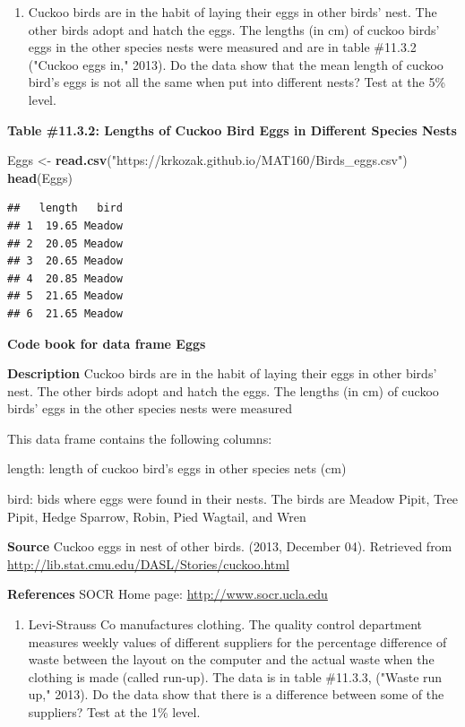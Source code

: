 \documentclass[]{book}
\newenvironment{Shaded}{\begin{snugshade}}{\end{snugshade}}
\newcommand{\KeywordTok}[1]{\textcolor[rgb]{0.13,0.29,0.53}{\textbf{#1}}}
\newcommand{\NormalTok}[1]{#1}
\newcommand{\StringTok}[1]{\textcolor[rgb]{0.31,0.60,0.02}{#1}}
\providecommand{\tightlist}{%
  \setlength{\itemsep}{0pt}\setlength{\parskip}{0pt}}
\begin{document}
\begin{enumerate}
\def\labelenumi{\arabic{enumi}.}
\tightlist
\item
  Cuckoo birds are in the habit of laying their eggs in other birds' nest. The other birds adopt and hatch the eggs. The lengths (in cm) of cuckoo birds' eggs in the other species nests were measured and are in table \#11.3.2 ("Cuckoo eggs in," 2013). Do the data show that the mean length of cuckoo bird's eggs is not all the same when put into different nests? Test at the 5\% level.
\end{enumerate}

\textbf{Table \#11.3.2: Lengths of Cuckoo Bird Eggs in Different Species Nests}

\begin{Shaded}
\begin{Highlighting}[]
\NormalTok{Eggs <-}\StringTok{ }\KeywordTok{read.csv}\NormalTok{(}\StringTok{"https://krkozak.github.io/MAT160/Birds_eggs.csv"}\NormalTok{)}
\KeywordTok{head}\NormalTok{(Eggs)}
\end{Highlighting}
\end{Shaded}

\begin{verbatim}
##   length   bird
## 1  19.65 Meadow
## 2  20.05 Meadow
## 3  20.65 Meadow
## 4  20.85 Meadow
## 5  21.65 Meadow
## 6  21.65 Meadow
\end{verbatim}

\textbf{Code book for data frame Eggs}

\textbf{Description}
Cuckoo birds are in the habit of laying their eggs in other birds' nest. The other birds adopt and hatch the eggs. The lengths (in cm) of cuckoo birds' eggs in the other species nests were measured

This data frame contains the following columns:

length: length of cuckoo bird's eggs in other species nets (cm)

bird: bids where eggs were found in their nests. The birds are Meadow Pipit, Tree Pipit, Hedge Sparrow, Robin, Pied Wagtail, and Wren

\textbf{Source}
Cuckoo eggs in nest of other birds. (2013, December 04). Retrieved from
\url{http://lib.stat.cmu.edu/DASL/Stories/cuckoo.html}

\textbf{References}
SOCR Home page: \url{http://www.socr.ucla.edu}

\begin{enumerate}
\def\labelenumi{\arabic{enumi}.}
\setcounter{enumi}{1}
\tightlist
\item
  Levi-Strauss Co manufactures clothing. The quality control department measures weekly values of different suppliers for the percentage difference of waste between the layout on the computer and the actual waste when the clothing is made (called run-up). The data is in table \#11.3.3, ("Waste run up," 2013). Do the data show that there is a difference between some of the suppliers? Test at the 1\% level.
\end{enumerate}
\end{document}
